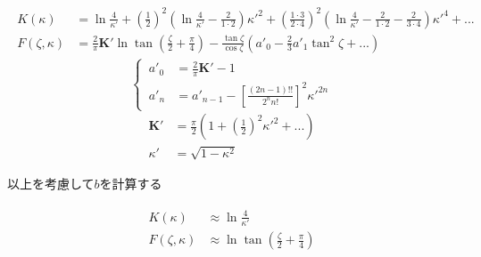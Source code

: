 \documentclass[dvipdfmx]{report} %
\begin{document}
\begin{tcolorbox}[title=$ \kappa \approx 1 $での公式]
\begin{eqnarray*}
\begin{split}
	K(\kappa) &= \ln \frac{4}{\kappa'} + \left( \frac{1}{2} \right)^2 \left( \ln \frac{4}{\kappa'} - \frac{2}{1 \cdot 2} \right) \kappa'^2 + \left( \frac{1 \cdot 3}{2 \cdot 4} \right)^2 \left( \ln \frac{4}{\kappa'} - \frac{2}{1 \cdot 2} - \frac{2}{3 \cdot 4} \right) \kappa'^4 + ... \\
	F(\zeta, \kappa) &= \frac{2}{\pi} \bm{K'} \ln \tan \left( \frac{\zeta}{2} + \frac{\pi}{4} \right) - \frac{\tan \zeta}{\cos \zeta} \left( a'_0 - \frac{2}{3}a'_1\tan^2 \zeta + ... \right)
\end{split}
\end{eqnarray*}
\begin{equation*}
\left\{ \,
\begin{aligned}
	a'_0 &= \frac{2}{\pi}\bm{K'} - 1\\
	a'_n &= a'_{n-1} - \left[ \frac{(2n-1)!!}{2^{n}n!} \right]^2 \kappa'^{2n}
\end{aligned}
\right.
\end{equation*}
\begin{equation*}
\begin{split}
	\bm{K'} &= \frac{\pi}{2} \left( 1 + \left( \frac{1}{2} \right)^2 \kappa'^2 + ... \right)\\
	\kappa' &= \sqrt{1-\kappa^2}
\end{split}
\end{equation*}
\end{tcolorbox}

以上を考慮して$b$を計算する

\begin{eqnarray*}
\begin{split}
	K(\kappa) &\approx \ln \frac{4}{\kappa'}\\
	F(\zeta, \kappa) &\approx \ln \tan \left( \frac{\zeta}{2} + \frac{\pi}{4} \right)\\
\end{split}
\end{eqnarray*}
\end{document}
